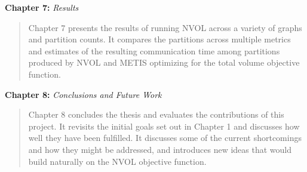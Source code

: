 \textbf{Chapter 7:} \textit{Results}
\begin{quote}
	Chapter 7 presents the results of running NVOL across a variety of graphs and partition counts. It compares the partitions across multiple metrics and estimates of the resulting communication time among partitions produced by NVOL and METIS optimizing for the total volume objective function.
\end{quote}
\textbf{Chapter 8:} \textit{Conclusions and Future Work}
\begin{quote}
	Chapter 8 concludes the thesis and evaluates the contributions of this project. It revisits the initial goals set out in Chapter 1 and discusses how well they have been fulfilled. It discusses some of the current shortcomings and how they might be addressed, and introduces new ideas that would build naturally on the NVOL objective function.
\end{quote}
